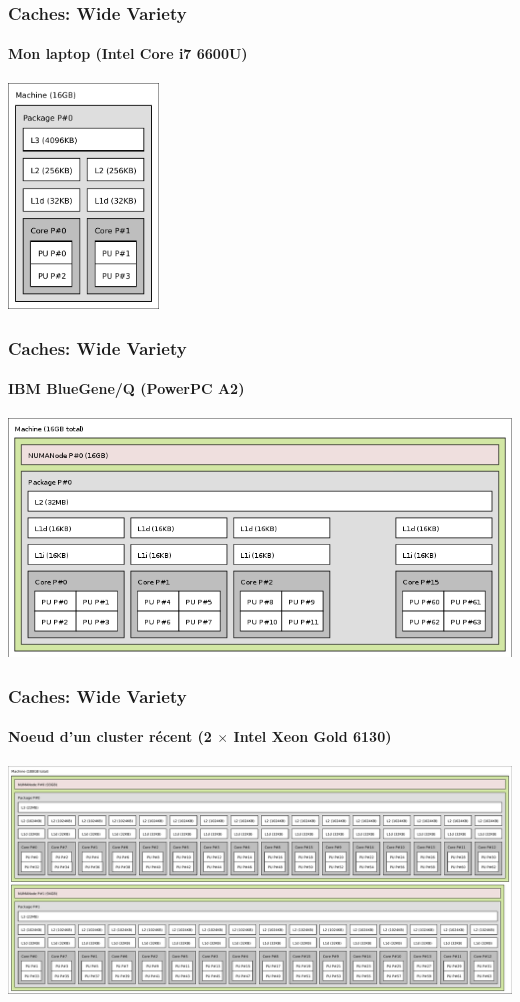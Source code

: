 \documentclass[xcolor={x11names,svgnames}]{beamer}
\begin{document}
\begin{frame}[label=caches]
  \frametitle{Caches: Wide Variety}
  \framesubtitle{Mon laptop  (Intel Core i7 6600U)}
  \centering
  \includegraphics[height=6cm]{lstopo_laptop.pdf}
\end{frame}
  
\begin{frame}[label=caches]
  \frametitle{Caches: Wide Variety}
  \framesubtitle{IBM BlueGene/Q (PowerPC A2)}
  \centering
  \includegraphics[width=\textwidth]{lstopo_bgq.png}
\end{frame}

\begin{frame}[label=caches]
  \frametitle{Caches: Wide Variety}
  \framesubtitle{Noeud d'un cluster récent (2 $\times$ Intel Xeon Gold 6130)}
  \centering
  \includegraphics[width=\textwidth]{lstopo_gr20.pdf}
\end{frame}
\end{document}
